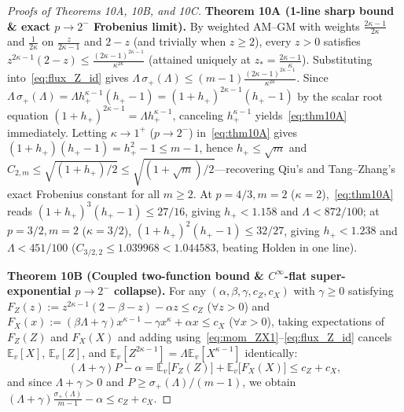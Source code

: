 \documentclass[10pt,letterpaper]{article}
\begin{document}
\begin{proof}[Proofs of Theorems 10A, 10B, and 10C]
\textbf{Theorem 10A (1-line sharp bound \& exact $p \to 2^-$ Frobenius limit).}
By weighted AM--GM with weights $\frac{2\kappa-1}{2\kappa}$ and $\frac{1}{2\kappa}$ on $\frac{z}{2\kappa-1}$ and $2 - z$ (and trivially when $z \ge 2$), every $z > 0$ satisfies $z^{2\kappa-1}(2 - z) \le \frac{(2\kappa-1)^{2\kappa-1}}{\kappa^{2\kappa}}$ (attained uniquely at $z_* = \frac{2\kappa-1}{\kappa}$). Substituting into~\eqref{eq:flux_Z_id} gives $\Lambda\,\sigma_+(\Lambda) \le (m-1)\frac{(2\kappa-1)^{2\kappa-1}}{\kappa^{2\kappa}}$. Since $\Lambda\,\sigma_+(\Lambda) = \Lambda h_+^{\kappa-1}(h_+ - 1) = (1 + h_+)^{2\kappa-1}(h_+ - 1)$ by the scalar root equation $(1+h_+)^{2\kappa-1} = \Lambda h_+^{\kappa-1}$, canceling $h_+^{\kappa-1}$ yields~\eqref{eq:thm10A} immediately. Letting $\kappa \to 1^+$ ($p \to 2^-$) in~\eqref{eq:thm10A} gives $(1 + h_+)(h_+ - 1) = h_+^2 - 1 \le m - 1$, hence $h_+ \le \sqrt{m}$ and $C_{2,m} \le \sqrt{(1 + h_+)/2} \le \sqrt{(1 + \sqrt{m})/2}$—recovering Qiu's and Tang--Zhang's exact Frobenius constant for all $m \ge 2$. At $p = 4/3, m = 2$ ($\kappa = 2$),~\eqref{eq:thm10A} reads $(1+h_+)^3(h_+ - 1) \le 27/16$, giving $h_+ < 1.158$ and $\Lambda < 872/100$; at $p = 3/2, m = 2$ ($\kappa = 3/2$), $(1+h_+)^2(h_+ - 1) \le 32/27$, giving $h_+ < 1.238$ and $\Lambda < 451/100$ ($C_{3/2,2} \le 1.039968 < 1.044583$, beating Holden in one line).

\textbf{Theorem 10B (Coupled two-function bound \& $C^\infty$-flat super-exponential $p \to 2^-$ collapse).}
For any $(\alpha, \beta, \gamma, c_Z, c_X)$ with $\gamma \ge 0$ satisfying $F_Z(z) := z^{2\kappa-1}(2-\beta-z) - \alpha z \le c_Z$ ($\forall z > 0$) and $F_X(x) := (\beta\Lambda + \gamma)x^{\kappa-1} - \gamma x^\kappa + \alpha x \le c_X$ ($\forall x > 0$), taking expectations of $F_Z(Z)$ and $F_X(X)$ and adding using~\eqref{eq:mom_ZX1}--\eqref{eq:flux_Z_id} cancels $\mathbb{E}_v[X]$, $\mathbb{E}_v[Z]$, and $\mathbb{E}_v[Z^{2\kappa-1}] = \Lambda\mathbb{E}_v[X^{\kappa-1}]$ identically:
\[
  (\Lambda + \gamma)P - \alpha
  = \mathbb{E}_v\bigl[F_Z(Z)\bigr] + \mathbb{E}_v\bigl[F_X(X)\bigr]
  \le c_Z + c_X,
\]
and since $\Lambda + \gamma > 0$ and $P \ge \sigma_+(\Lambda)/(m-1)$, we obtain $(\Lambda + \gamma)\frac{\sigma_+(\Lambda)}{m-1} - \alpha \le c_Z + c_X$.


\end{proof}
\end{document}
